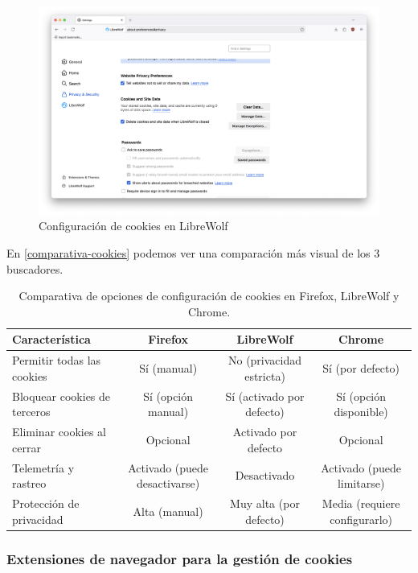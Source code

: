 \begin{figure}[H]   
    \includegraphics[width=\textwidth]{cookies_librewolf_ej14a.png}
    \caption{Configuración de cookies en LibreWolf}
    \label{fig:cookies_librewolf}
\end{figure}

En \ref{comparativa-cookies} podemos ver una comparación más visual de los 3 buscadores.

\begin{table}[H]
    \centering
    \begin{tabular}{|l|c|c|c|}
    \hline
    \textbf{Característica} & \textbf{Firefox} & \textbf{LibreWolf} & \textbf{Chrome} \\ \hline
    Permitir todas las cookies & Sí (manual) & No (privacidad estricta) & Sí (por defecto) \\ \hline
    Bloquear cookies de terceros & Sí (opción manual) & Sí (activado por defecto) & Sí (opción disponible) \\ \hline
    Eliminar cookies al cerrar & Opcional & Activado por defecto & Opcional \\ \hline
    Telemetría y rastreo & Activado (puede desactivarse) & Desactivado & Activado (puede limitarse) \\ \hline
    Protección de privacidad & Alta (manual) & Muy alta (por defecto) & Media (requiere configurarlo) \\ \hline
    \end{tabular}
    \caption{Comparativa de opciones de configuración de cookies en Firefox, LibreWolf y Chrome.}
    \label{tab:comparativa-cookies}
\end{table}

\subsubsection{Extensiones de navegador para la gestión de cookies}

